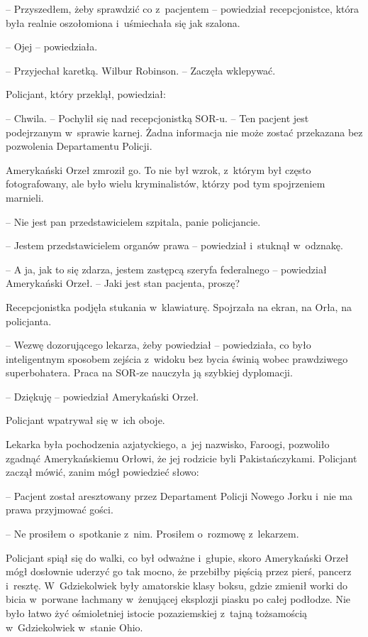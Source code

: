 \documentclass[oneside,polish,11pt,sfheadings]{mwbk}
\begin{document}
-- Przyszedłem, żeby sprawdzić co z~pacjentem -- powiedział
recepcjonistce, która była realnie oszołomiona i~uśmiechała się jak
szalona.

-- Ojej -- powiedziała.

-- Przyjechał karetką. Wilbur Robinson. -- Zaczęła wklepywać.

Policjant, który przeklął, powiedział: 

-- Chwila. -- Pochylił się nad
recepcjonistką SOR-u. -- Ten pacjent jest podejrzanym w~sprawie karnej.
Żadna informacja nie może zostać przekazana bez pozwolenia Departamentu
Policji.

Amerykański Orzeł zmroził go. To nie był wzrok, z~którym był często
fotografowany, ale było wielu kryminalistów, którzy pod tym spojrzeniem
marnieli. 

-- Nie jest pan przedstawicielem szpitala, panie policjancie.

-- Jestem przedstawicielem organów prawa -- powiedział i~stuknął w~odznakę.

-- A ja, jak to się zdarza, jestem zastępcą szeryfa federalnego -- powiedział Amerykański Orzeł. -- Jaki jest stan pacjenta, proszę?

Recepcjonistka podjęła stukania w~klawiaturę. Spojrzała na ekran, na
Orła, na policjanta. 

-- Wezwę dozorującego lekarza, żeby powiedział -- powiedziała, co było inteligentnym sposobem zejścia z~widoku bez bycia
świnią wobec prawdziwego superbohatera. Praca na SOR-ze nauczyła ją
szybkiej dyplomacji.

-- Dziękuję -- powiedział Amerykański Orzeł.

Policjant wpatrywał się w~ich oboje.

Lekarka była pochodzenia azjatyckiego, a~jej nazwisko, Faroogi,
pozwoliło zgadnąć Amerykańskiemu Orłowi, że jej rodzicie byli
Pakistańczykami. Policjant zaczął mówić, zanim mógł powiedzieć słowo: 

-- Pacjent został aresztowany przez Departament Policji Nowego Jorku i~nie
ma prawa przyjmować gości.

-- Ne prosiłem o~spotkanie z~nim. Prosiłem o~rozmowę z~lekarzem.

Policjant spiął się do walki, co był odważne i~głupie, skoro Amerykański
Orzeł mógł dosłownie uderzyć go tak mocno, że przebiłby pięścią przez
pierś, pancerz i~resztę. W~Gdziekolwiek były amatorskie klasy boksu,
gdzie zmienił worki do bicia w~porwane łachmany w~żenującej eksplozji
piasku po całej podłodze. Nie było łatwo żyć ośmioletniej istocie
pozaziemskiej z~tajną tożsamością w~Gdziekolwiek w~stanie Ohio.
\end{document}
